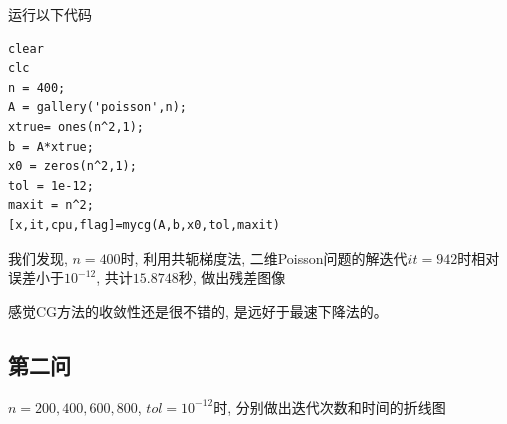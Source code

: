 \documentclass[10pt]{SelfArx} %
\numberwithin{dummy}{section}
\begin{document}
运行以下代码
\begin{lstlisting}
clear
clc
n = 400;
A = gallery('poisson',n);
xtrue= ones(n^2,1);
b = A*xtrue;
x0 = zeros(n^2,1);
tol = 1e-12;
maxit = n^2;
[x,it,cpu,flag]=mycg(A,b,x0,tol,maxit)
\end{lstlisting}

我们发现, $n=400$时, 利用共轭梯度法, 二维Poisson问题的解迭代$it=942$时相对误差小于$10^{-12}$, 共计$15.8748$秒, 做出残差图像

\begin{figure}[h]
	\centering
\end{figure}

感觉CG方法的收敛性还是很不错的, 是远好于最速下降法的。
\subsection{第二问}
$n=200,400,600,800$, $tol=10^{-12}$时, 分别做出迭代次数和时间的折线图
\begin{figure}[h]
	\centering
\end{figure}
\end{document}
